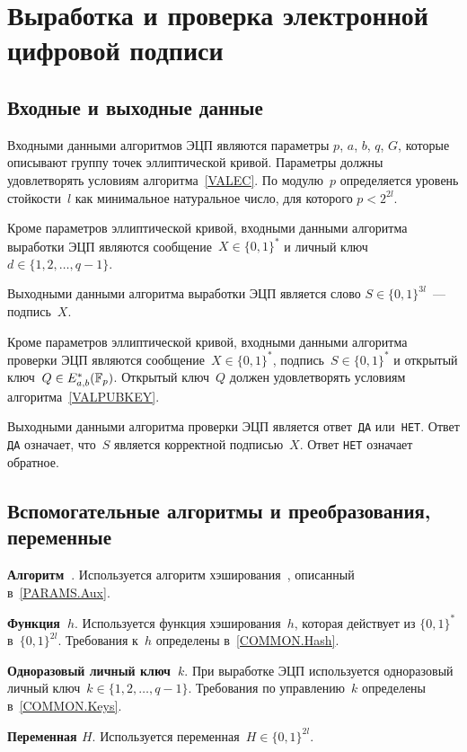 \section{Выработка и проверка электронной цифровой подписи}\label{SIGN}

\subsection{Входные и выходные данные}

Входными данными алгоритмов ЭЦП являются 
параметры $p$, $a$, $b$, $q$, $G$, которые описывают группу 
точек эллиптической кривой.
Параметры должны удовлетворять условиям алгоритма~\ref{VALEC}. 
По модулю~$p$ определяется уровень стойкости~$l$ как минимальное 
натуральное число, для которого $p<2^{2l}$.

Кроме параметров эллиптической кривой,
входными данными алгоритма выработки ЭЦП
являются сообщение~$X\in\{0,1\}^*$
и личный ключ~$d\in\{1,2,\ldots,q-1\}$.

Выходными данными алгоритма выработки ЭЦП
является слово $S\in\{0,1\}^{3l}$~--- 
подпись~$X$.

Кроме параметров эллиптической кривой,
входными данными алгоритма проверки ЭЦП 
являются сообщение~$X\in\{0,1\}^*$,
подпись~$S\in\{0,1\}^*$ и открытый ключ~$Q\in E_{a,b}^*(\mathbb{F}_p)$.
%
Открытый ключ~$Q$ должен удовлетворять условиям
алгоритма~\ref{VALPUBKEY}.

Выходными данными алгоритма проверки ЭЦП
является ответ~\texttt{ДА} или~\texttt{НЕТ}.
Ответ \texttt{ДА} означает, что~$S$ 
является корректной подписью~$X$.
Ответ \texttt{НЕТ} означает обратное.

\subsection{Вспомогательные алгоритмы и преобразования, переменные}
\label{SIGN.Aux}

{\bf Алгоритм~}.
Используется алгоритм хэширования~, 
описанный в~\ref{PARAMS.Aux}.

{\bf Функция~$h$}.
Используется функция хэширования~$h$, 
которая действует из $\{0,1\}^{*}$ в~$\{0,1\}^{2l}$.
Требования к~$h$ определены в~\ref{COMMON.Hash}.

{\bf Одноразовый личный ключ~$k$}.
При выработке ЭЦП используется одноразовый личный 
ключ~$k\in\{1,2,\ldots,q-1\}$.
Требования по управлению~$k$ определены в~\ref{COMMON.Keys}.

{\bf Переменная $H$}.
Используется переменная~$H\in\{0,1\}^{2l}$.

